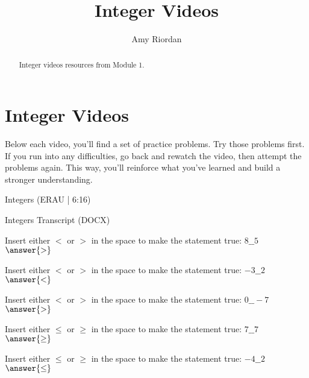 \documentclass{ximera}
\title{Integer Videos}
\author{Amy Riordan}
\begin{document}
\begin{abstract}
Integer videos resources from Module 1.
\end{abstract}
\maketitle

\section*{Integer Videos}

Below each video, you’ll find a set of practice problems. Try those problems first. If you run into any difficulties, go back and rewatch the video, then attempt the problems again. This way, you’ll reinforce what you’ve learned and build a stronger understanding.

Integers (ERAU | 6:16)


Integers Transcript (DOCX)


\begin{problem}
Insert either $<$ or $>$ in the space to make the statement true: $8\_\_5$\\
$\answer{>}$
\end{problem}

\begin{problem}
Insert either $<$ or $>$ in the space to make the statement true: $-3\_\_2$\\
$\answer{<}$
\end{problem}

\begin{problem}
Insert either $<$ or $>$ in the space to make the statement true: $0\_\_-7$\\
$\answer{>}$
\end{problem}



\begin{problem}
Insert either $\leq$ or $\geq$ in the space to make the statement true: $7\_\_7$\\
$\answer{\geq}$
\end{problem}

\begin{problem}
Insert either $\leq$ or $\geq$ in the space to make the statement true: $-4\_\_2$\\
$\answer{\leq}$
\end{problem}
\end{document}
